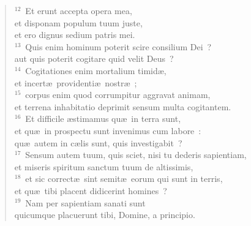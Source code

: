 \begin{flushleft}
\begin{verse}
${}^{12}$~Et erunt accepta opera mea,\\ et disponam populum tuum juste,\\ et ero dignus sedium patris mei.\\
${}^{13}$~Quis enim hominum poterit scire consilium Dei~?\\ aut quis poterit cogitare quid velit Deus~?\\
${}^{14}$~Cogitationes enim mortalium timid\ae ,\\ et incert\ae\ providenti\ae\ nostr\ae~;\\
${}^{15}$~corpus enim quod corrumpitur aggravat animam,\\ et terrena inhabitatio deprimit sensum multa cogitantem.\\
${}^{16}$~Et difficile \ae stimamus qu\ae\ in terra sunt,\\ et qu\ae\ in prospectu sunt invenimus cum labore~:\\ qu\ae\ autem in c\ae lis sunt, quis investigabit~?\\
${}^{17}$~Sensum autem tuum, quis sciet, nisi tu dederis sapientiam,\\ et miseris spiritum sanctum tuum de altissimis,\\
${}^{18}$~et sic correct\ae\ sint semit\ae\ eorum qui sunt in terris,\\ et qu\ae\ tibi placent didicerint homines~?\\
${}^{19}$~Nam per sapientiam sanati sunt\\ quicumque placuerunt tibi, Domine, a principio.\end{verse}\end{flushleft}


